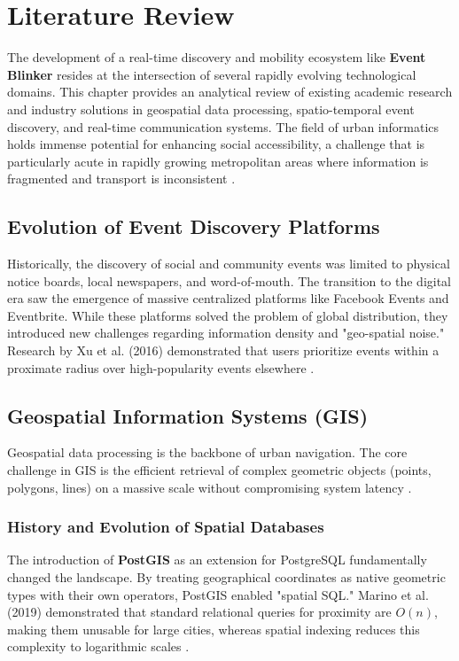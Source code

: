 \chapter{Literature Review}
The development of a real-time discovery and mobility ecosystem like \textbf{Event Blinker} resides at the intersection of several rapidly evolving technological domains. This chapter provides an analytical review of existing academic research and industry solutions in geospatial data processing, spatio-temporal event discovery, and real-time communication systems. The field of urban informatics holds immense potential for enhancing social accessibility, a challenge that is particularly acute in rapidly growing metropolitan areas where information is fragmented and transport is inconsistent \cite{urbanGIS}.

\section{Evolution of Event Discovery Platforms}
Historically, the discovery of social and community events was limited to physical notice boards, local newspapers, and word-of-mouth. The transition to the digital era saw the emergence of massive centralized platforms like Facebook Events and Eventbrite. While these platforms solved the problem of global distribution, they introduced new challenges regarding information density and "geo-spatial noise." Research by Xu et al. (2016) demonstrated that users prioritize events within a proximate radius over high-popularity events elsewhere \cite{mapbox}.

\section{Geospatial Information Systems (GIS)}
Geospatial data processing is the backbone of urban navigation. The core challenge in GIS is the efficient retrieval of complex geometric objects (points, polygons, lines) on a massive scale without compromising system latency \cite{postgis}.

\subsection{History and Evolution of Spatial Databases}
The introduction of \textbf{PostGIS} as an extension for PostgreSQL fundamentally changed the landscape. By treating geographical coordinates as native geometric types with their own operators, PostGIS enabled "spatial SQL." Marino et al. (2019) demonstrated that standard relational queries for proximity are $O(n)$, making them unusable for large cities, whereas spatial indexing reduces this complexity to logarithmic scales \cite{postgis}.

